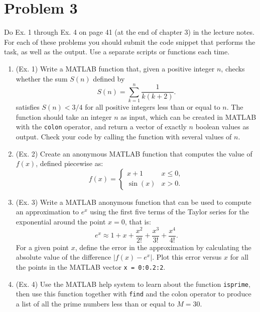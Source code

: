 \section{Problem 3}%
\label{sec:problem_3}
Do Ex. 1 through Ex. 4 on page 41 (at the end of chapter 3) in the lecture notes. For each of these problems you should submit the code snippet that performs the task, as well as the output. Use a separate scripts or functions each time.
\begin{enumerate}
  \item (Ex. 1) Write a MATLAB function that, given a positive integer $n$, checks whether the sum $S(n)$ defined by
    \begin{equation*}
      S(n) = \sum_{k = 1}^{n} \frac{1}{k (k + 2)}.
    \end{equation*}
  satisfies $S(n) < 3/4$ for all positive integers less than or equal to $n$. The function should take an integer $n$ as input, which can be created in MATLAB with the \verb|colon| operator, and return a vector of exactly $n$ boolean values as output. Check your code by calling the function with several values of $n$.
  \item (Ex. 2) Create an anonymous MATLAB function that computes the value of $f(x)$, defined piecewise as:
    \begin{equation*}
      f(x) = \begin{cases}
        x + 1   & x \leq 0, \\
        \sin(x) & x > 0.
      \end{cases}
    \end{equation*}
  \item (Ex. 3) Write a MATLAB anonymous function that can be used to compute an approximation to $e^{x}$ using the first five terms of the Taylor series for the exponential around the point $x = 0$, that is:
    \begin{equation*}
      e^{x}
      \approx 1 + x + \frac{x^{2}}{2!} + \frac{x^{3}}{3!} + \frac{x^{4}}{4!}.
    \end{equation*}
    For a given point $x$, define the error in the approximation by calculating the absolute value of the difference $|f(x) - e^{x}|$. Plot this error versus $x$ for all the points in the MATLAB vector \verb|x = 0:0.2:2|.
  \item (Ex. 4) Use the MATLAB help system to learn about the function \verb|isprime|, then use this function together with \verb|find| and the colon operator to produce a list of all the prime numbers less than or equal to $M = 30$.
\end{enumerate}
